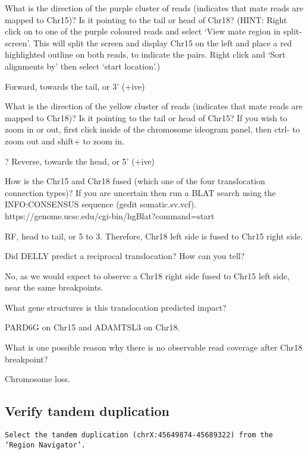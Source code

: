 \begin{steps}
\begin{questions}
What is the direction of the purple cluster of reads (indicates that mate reads are mapped to Chr15)? Is it pointing to the tail or head of Chr18? 
(HINT: Right click on to one of the purple coloured reads and select ‘View mate region in split-screen’. This will split the screen and display Chr15 on the left and place a red highlighted outline on both reads, to indicate the pairs. Right click and ‘Sort alignments by’ then select ‘start location’.)
\begin{answer}
Forward, towards the tail, or 3’ (+ive)
\end{answer}

What is the direction of the yellow cluster of reads (indicates that mate reads are mapped to Chr18)? Is it pointing to the tail or head of Chr15? 
If you wish to zoom in or out, first click inside of the chromosome ideogram panel, then ctrl- to zoom out and shift+ to zoom in. 
\begin{answer}
? Reverse, towards the head, or 5’ (+ive)
\end{answer}

How is the Chr15 and Chr18 fused (which one of the four translocation connection types)?  If you are uncertain then run a BLAT search using the INFO:CONSENSUS sequence (gedit  somatic.sv.vcf). https://genome.ucsc.edu/cgi-bin/hgBlat?command=start
\begin{answer}
RF, head to tail, or 5 to 3. Therefore, Chr18 left side is fused to Chr15 right side.
\end{answer}
Did DELLY predict a reciprocal translocation? How can you tell? 
\begin{answer}
No, as we would expect to observe a Chr18 right side fused to Chr15 left side, near the same breakpoints.  
\end{answer}
What gene structures is this translocation predicted impact? 
\begin{answer}
PARD6G on Chr15 and ADAMTSL3 on Chr18.
\end{answer}
What is one possible reason why there is no observable read coverage after Chr18 breakpoint? 
\begin{answer}
Chromosome loss.
\end{answer}
\end{questions}

\subsection{Verify tandem duplication}
\begin{advanced}
\begin{lstlisting}
Select the tandem duplication (chrX:45649874-45689322) from the ‘Region Navigator’.


\end{lstlisting}
\end{advanced}
\end{steps}
